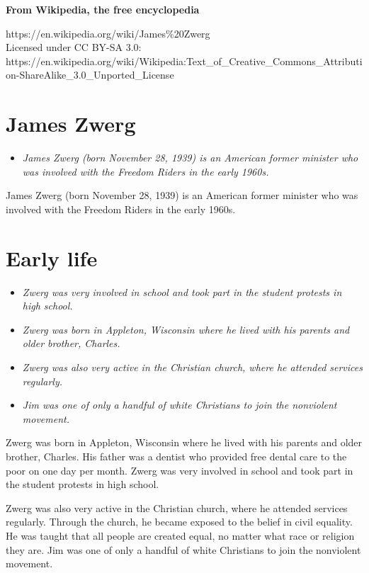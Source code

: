 \textbf{From Wikipedia, the free encyclopedia}

https://en.wikipedia.org/wiki/James\%20Zwerg\\
Licensed under CC BY-SA 3.0:\\
https://en.wikipedia.org/wiki/Wikipedia:Text\_of\_Creative\_Commons\_Attribution-ShareAlike\_3.0\_Unported\_License

\section{James Zwerg}\label{james-zwerg}

\begin{itemize}
\item
  \emph{James Zwerg (born November 28, 1939) is an American former
  minister who was involved with the Freedom Riders in the early 1960s.}
\end{itemize}

James Zwerg (born November 28, 1939) is an American former minister who
was involved with the Freedom Riders in the early 1960s.

\section{Early life}\label{early-life}

\begin{itemize}
\item
  \emph{Zwerg was very involved in school and took part in the student
  protests in high school.}
\item
  \emph{Zwerg was born in Appleton, Wisconsin where he lived with his
  parents and older brother, Charles.}
\item
  \emph{Zwerg was also very active in the Christian church, where he
  attended services regularly.}
\item
  \emph{Jim was one of only a handful of white Christians to join the
  nonviolent movement.}
\end{itemize}

Zwerg was born in Appleton, Wisconsin where he lived with his parents
and older brother, Charles. His father was a dentist who provided free
dental care to the poor on one day per month. Zwerg was very involved in
school and took part in the student protests in high school.

Zwerg was also very active in the Christian church, where he attended
services regularly. Through the church, he became exposed to the belief
in civil equality. He was taught that all people are created equal, no
matter what race or religion they are. Jim was one of only a handful of
white Christians to join the nonviolent movement.

